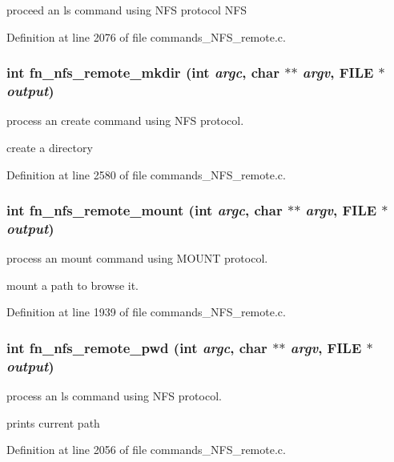 proceed an ls command using NFS protocol NFS 

Definition at line 2076 of file commands\_\-NFS\_\-remote.c.
\subsubsection[{fn\_\-nfs\_\-remote\_\-mkdir}]{\setlength{\rightskip}{0pt plus 5cm}int fn\_\-nfs\_\-remote\_\-mkdir (int {\em argc}, \/  char $\ast$$\ast$ {\em argv}, \/  FILE $\ast$ {\em output})}\label{commands_8h_a2b93fc9c178407b8be3340c2d2b9463d}
process an create command using NFS protocol.

create a directory 

Definition at line 2580 of file commands\_\-NFS\_\-remote.c.
\subsubsection[{fn\_\-nfs\_\-remote\_\-mount}]{\setlength{\rightskip}{0pt plus 5cm}int fn\_\-nfs\_\-remote\_\-mount (int {\em argc}, \/  char $\ast$$\ast$ {\em argv}, \/  FILE $\ast$ {\em output})}\label{commands_8h_a2fa932d8573b9d9cf1b25a1515750cfa}
process an mount command using MOUNT protocol.

mount a path to browse it. 

Definition at line 1939 of file commands\_\-NFS\_\-remote.c.
\subsubsection[{fn\_\-nfs\_\-remote\_\-pwd}]{\setlength{\rightskip}{0pt plus 5cm}int fn\_\-nfs\_\-remote\_\-pwd (int {\em argc}, \/  char $\ast$$\ast$ {\em argv}, \/  FILE $\ast$ {\em output})}\label{commands_8h_a711fe3c372610defb306bfd74d66dca4}
process an ls command using NFS protocol.

prints current path 

Definition at line 2056 of file commands\_\-NFS\_\-remote.c.
